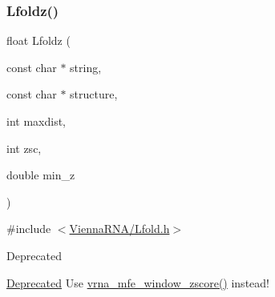 \subsubsection{\texorpdfstring{Lfoldz()}{Lfoldz()}}
{\footnotesize\ttfamily float Lfoldz (\begin{DoxyParamCaption}\item[{const char $\ast$}]{string,  }\item[{const char $\ast$}]{structure,  }\item[{int}]{maxdist,  }\item[{int}]{zsc,  }\item[{double}]{min\+\_\+z }\end{DoxyParamCaption})}



{\ttfamily \#include $<$\hyperlink{Lfold_8h}{Vienna\+R\+N\+A/\+Lfold.\+h}$>$}

\begin{DoxyRefDesc}{Deprecated}
\item[\hyperlink{deprecated__deprecated000087}{Deprecated}]Use \hyperlink{group__mfe__window_gaa4f67ae94efd08d800c17f9b53423fd6}{vrna\+\_\+mfe\+\_\+window\+\_\+zscore()} instead! \end{DoxyRefDesc}
